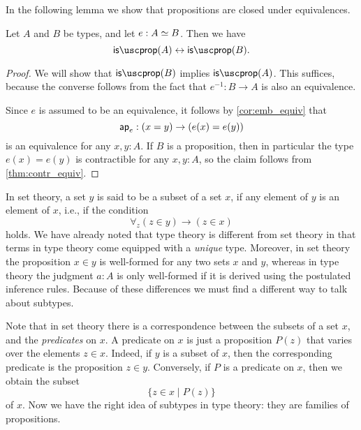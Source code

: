 In the following lemma we show that propositions are closed under equivalences.

\begin{lem}\label{lem:prop_equiv}
Let $A$ and $B$ be types, and let $e:\eqv{A}{B}$. Then we have
\begin{equation*}
\isprop(A)\leftrightarrow\isprop(B).
\end{equation*}
\end{lem}

\begin{proof}
We will show that $\isprop(B)$ implies $\isprop(A)$. This suffices, because the converse follows from the fact that $e^{-1}:B\to A$ is also an equivalence. 

Since $e$ is assumed to be an equivalence, it follows by \cref{cor:emb_equiv} that
\begin{equation*}
\mathsf{ap}_{e} : (x=y)\to (e(x)=e(y))
\end{equation*}
is an equivalence for any $x,y:A$. If $B$ is a proposition, then in particular the type $e(x)=e(y)$ is contractible for any $x,y:A$, so the claim follows from \cref{thm:contr_equiv}.
\end{proof}

  In set theory, a set $y$ is said to be a subset of a set $x$, if any element of $y$ is an element of $x$, i.e., if the condition
  \begin{equation*}
    \forall_z (z\in y)\to (z\in x)
  \end{equation*}
  holds. We have already noted that type theory is different from set theory in that terms in type theory come equipped with a \emph{unique} type. Moreover, in set theory the proposition $x\in y$ is well-formed for any two sets $x$ and $y$, whereas in type theory the judgment $a:A$ is only well-formed if it is derived using the postulated inference rules. Because of these differences we must find a different way to talk about subtypes.

  Note that in set theory there is a correspondence between the subsets of a set $x$, and the \emph{predicates} on $x$. A predicate on $x$ is just a proposition $P(z)$ that varies over the elements $z\in x$. Indeed, if $y$ is a subset of $x$, then the corresponding predicate is the proposition $z\in y$. Conversely, if $P$ is a predicate on $x$, then we obtain the subset
  \begin{equation*}
    \{z\in x\mid P(z)\}
  \end{equation*}
  of $x$. Now we have the right idea of subtypes in type theory: they are families of propositions.

